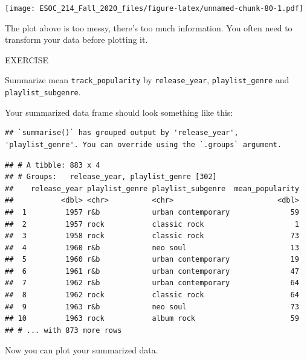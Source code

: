 \documentclass[
]{book}
\newenvironment{Shaded}{\begin{snugshade}}{\end{snugshade}}
\newcommand{\DataTypeTok}[1]{\textcolor[rgb]{0.13,0.29,0.53}{#1}}
\newcommand{\KeywordTok}[1]{\textcolor[rgb]{0.13,0.29,0.53}{\textbf{#1}}}
\newcommand{\NormalTok}[1]{#1}
\newcommand{\OperatorTok}[1]{\textcolor[rgb]{0.81,0.36,0.00}{\textbf{#1}}}
\newcommand{\StringTok}[1]{\textcolor[rgb]{0.31,0.60,0.02}{#1}}
\begin{document}
\texttt{[image: ESOC\_214\_Fall\_2020\_files/figure-latex/unnamed-chunk-80-1.pdf]}

The plot above is too messy, there's too much information. You often need to transform your data before plotting it.

EXERCISE

Summarize mean \texttt{track\_popularity} by \texttt{release\_year}, \texttt{playlist\_genre} and \texttt{playlist\_subgenre}.

Your summarized data frame should look something like this:

\begin{verbatim}
## `summarise()` has grouped output by 'release_year', 'playlist_genre'. You can override using the `.groups` argument.
\end{verbatim}

\begin{verbatim}
## # A tibble: 883 x 4
## # Groups:   release_year, playlist_genre [302]
##    release_year playlist_genre playlist_subgenre  mean_popularity
##           <dbl> <chr>          <chr>                        <dbl>
##  1         1957 r&b            urban contemporary              59
##  2         1957 rock           classic rock                     1
##  3         1958 rock           classic rock                    73
##  4         1960 r&b            neo soul                        13
##  5         1960 r&b            urban contemporary              19
##  6         1961 r&b            urban contemporary              47
##  7         1962 r&b            urban contemporary              64
##  8         1962 rock           classic rock                    64
##  9         1963 r&b            neo soul                        73
## 10         1963 rock           album rock                      59
## # ... with 873 more rows
\end{verbatim}

Now you can plot your summarized data.

\begin{Shaded}
\end{Shaded}
\end{document}

